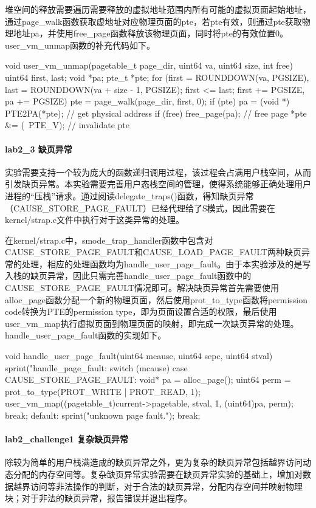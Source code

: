 堆空间的释放需要遍历需要释放的虚拟地址范围内所有可能的虚拟页面起始地址，通过page_walk函数获取虚地址对应物理页面的pte，若pte有效，则通过pte获取物理地址pa，并使用free_page函数释放该物理页面，同时将pte的有效位置0。user_vm_unmap函数的补充代码如下。

\begin{cppcode}
void user_vm_unmap(pagetable_t page_dir, uint64 va, uint64 size, int free) {
    uint64 first, last;
    void *pa;
    pte_t *pte;
    for (first = ROUNDDOWN(va, PGSIZE), last = ROUNDDOWN(va + size - 1, PGSIZE);
         first <= last; first += PGSIZE, pa += PGSIZE) {
        pte = page_walk(page_dir, first, 0);
        if (pte) {
            pa = (void *) PTE2PA(*pte); // get physical address
            if (free) free_page(pa);    // free page
            *pte &= (~PTE_V);           // invalidate pte
        }
    }
}
\end{cppcode}
\paragraph{lab2_3 缺页异常} 实验需要支持一个较为庞大的函数递归调用过程，该过程会占满用户栈空间，从而引发缺页异常。本实验需要完善用户态栈空间的管理，使得系统能够正确处理用户进程的“压栈”请求。通过阅读delegate_traps()函数，得知缺页异常（CAUSE_STORE_PAGE_FAULT）已经代理给了S模式，因此需要在kernel/strap.c文件中执行对于这类异常的处理。

在kernel/strap.c中，smode_trap_handler函数中包含对CAUSE_STORE_PAGE_FAULT和CAUSE_LOAD_PAGE_FAULT两种缺页异常的处理，相应的处理函数均为handle_user_page_fault。由于本实验涉及的是写入栈的缺页异常，因此只需完善handle_user_page_fault函数中的CAUSE_STORE_PAGE_FAULT情况即可。解决缺页异常首先需要使用alloc_page函数分配一个新的物理页面，然后使用prot_to_type函数将permission code转换为PTE的permission type，即为页面设置合适的权限，最后使用user_vm_map执行虚拟页面到物理页面的映射，即完成一次缺页异常的处理。handle_user_page_fault函数的实现如下。
\begin{cppcode}
void handle_user_page_fault(uint64 mcause, uint64 sepc, uint64 stval) {
    sprint("handle_page_fault: %
    switch (mcause) {
        case CAUSE_STORE_PAGE_FAULT:
            void* pa = alloc_page();
            uint64 perm = prot_to_type(PROT_WRITE | PROT_READ, 1);
            user_vm_map((pagetable_t)current->pagetable, stval, 1, (uint64)pa, perm);
            break;
        default:
            sprint("unknown page fault.\n");
            break;
    }
}
\end{cppcode}
\paragraph{lab2_challenge1 复杂缺页异常} 除较为简单的用户栈满造成的缺页异常之外，更为复杂的缺页异常包括越界访问动态分配的内存空间等。复杂缺页异常实验需要在缺页异常实验的基础上，增加对数据越界访问等非法操作的判断，对于合法的缺页异常，分配内存空间并映射物理块；对于非法的缺页异常，报告错误并退出程序。


